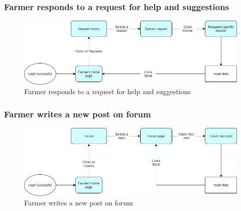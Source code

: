 \documentclass{article}
\begin{document}
        
        
        \subsubsection{Farmer responds to a request for help and suggestions}
            \begin{figure} [h]
                \centering
                \includegraphics[width=1\textwidth]{images/UserInterfaces/MapsFunctionalities/7. FarmerRespondsHelpAndSuggestions.jpg}
                \caption{\label{fig:FarmerResponseHelp}Farmer responds to a request for help and suggestions}
            \end{figure}
    
        \newpage
        
        
        \subsubsection{Farmer writes a new post on forum}
            \begin{figure} [h]
                \centering
                \includegraphics[width=1\textwidth]{images/UserInterfaces/MapsFunctionalities/8. FarmerWritesPostOnForum.jpg}
                \caption{\label{fig:FarmerWritesPost}Farmer writes a new post on forum}
            \end{figure}
        
        
\end{document}
